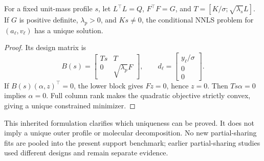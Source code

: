 \begin{Proposition}\label{prop:partial}
For a fixed unit-mass profile $s$, let $L^\top L=Q$, $F^\top F=G$, and $T=[K/\sigma;\sqrt{\lambda_s}L]$. If $G$ is positive definite, $\lambda_p>0$, and $Ks\ne0$, the conditional NNLS problem for $(a_\ell,v_\ell)$ has a unique solution.
\end{Proposition}
\begin{proof}
Its design matrix is
\begin{equation}\label{eq:partialdesign}
 B(s)=\begin{bmatrix}Ts&T\\0&\sqrt{\lambda_p}F\end{bmatrix},\qquad
 d_\ell=\begin{bmatrix}y_\ell/\sigma\\0\\0\end{bmatrix}.
\end{equation}
If $B(s)(\alpha,z)^\top=0$, the lower block gives $Fz=0$, hence $z=0$. Then $Ts\alpha=0$ implies $\alpha=0$. Full column rank makes the quadratic objective strictly convex, giving a unique constrained minimizer.
\end{proof}

This inherited formulation clarifies which uniqueness can be proved. It does not imply a unique outer profile or molecular decomposition. No new partial-sharing fits are pooled into the present support benchmark; earlier partial-sharing studies used different designs and remain separate evidence.
